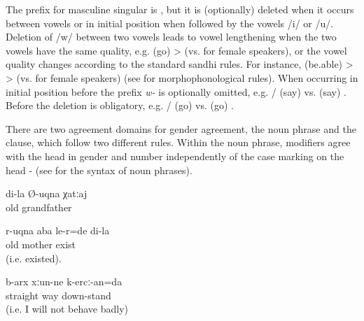 The prefix for masculine singular is , but it is (optionally) deleted when it occurs between vowels or in initial position when followed by the vowels /i/ or /u/. Deletion of /w/ between two vowels leads to vowel lengthening when the two vowels have the same quality, e.g.  (go) >   (vs.  for female speakers), or the vowel quality changes according to the standard sandhi rules. For instance,  (be.able) >  >   (vs.  for female speakers) (see  for morphophonological rules). When occurring in initial position before  the prefix \textit{w-} is optionally omitted, e.g. \slash{} (say) vs.  (say) . Before  the deletion is obligatory, e.g. \slash{} (go) vs.  (go) .

There are two agreement domains for gender agreement, the noun phrase and the clause, which follow two different rules. Within the noun phrase, modifiers agree with the head in gender and number independently of the case marking on the head -  (see  for the syntax of noun phrases).
%
\begin{exe}
	\ex	\label{ex:agreement number}
	\begin{xlist}
		\TabPositions{13em}
		\ex	{} 	\tab	{} 	\label{ex:agreement number@A}
		\ex	{} 	\tab	{} 	\label{ex:agreement number@B}
		\ex	{} 		\tab	{} 		\label{ex:agreement number@C}
	\end{xlist}

	\ex	\label{ex:my old grandfather agreement}
	\gll	di-la	Ø-uqna	χatːaj\\
			old	grandfather\\
	\glt	{}

	\ex	\label{ex:‎‎My old mother was alive agreement}
	\gll	r-uqna	aba	le-r=de	di-la\\
		old	mother	exist	\\
	\glt	{} (i.e. existed).

	\ex	\label{ex:I will be on the straight road agreement}
	\gll	b-arx	xːun-ne	k-ercː-an=da\\
		straight	way	down-stand\\
	\glt	{} (i.e. I will not behave badly)
\end{exe}


